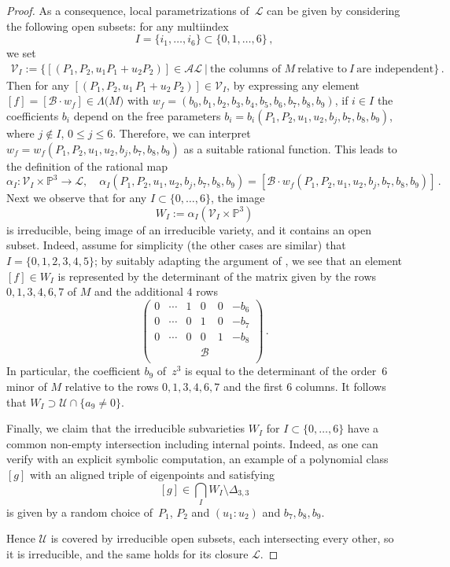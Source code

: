 \documentclass[a4paper, 11pt, reqno]{amsart}
\theoremstyle{plain}
\theoremstyle{definition}
\newcommand{\p}{\mathbb{P}}
\newcommand{\sL}{\mathcal{L}}
\newcommand{\sU}{\mathcal{U}}
\newcommand{\sV}{\mathcal{V}}
\begin{document}
\begin{proof}
As a consequence, local parametrizations of~$\sL$ can be given by considering the following open subsets:
for any multiindex
%
\[
  I = \{i_1, \dots, i_6\} \subset \{0, 1, \dots, 6\} \,,
\]
%
we set
%
\begin{multline*}
  \sV_I :=
  \bigl\{
    [(P_1, P_2, u_1 P_1 +u_2P_2)] \in \mathcal{AL} \ | \ \text{the\ columns\ of\ } M \
    \text{relative \ to} \ I\ \text{are\ independent}
  \bigr\} \,.
\end{multline*}
%
Then for any $[(P_1, P_2, u_1 \, P_1 + u_2 \, P_2)] \in \sV_I$, by expressing any element
$[f] =[\mathcal{B} \cdot w_f]\in \Lambda \bigl( M \bigr)$ with
$ w_f = (b_0,
  b_1,
  b_2,
  b_3,
  b_4,
  b_5, b_6,b_7,b_8,b_9)$,
%
if $i\in I$ the coefficients $b_i$ depend on the free parameters $b_i=b_i(P_1,P_2,u_1,u_2,b_j,b_7,b_8,b_9)$, where $j \not \in I$, $0\le j \le 6$. Therefore, we can interpret $w_f=w_f(P_1,P_2,u_1,u_2,b_j,b_7,b_8,b_9)$ as a suitable rational function.
This leads to the definition of the rational map
%
\[
  \alpha_I \colon \sV_I \times \p^3 \to \sL, \quad
  \alpha_I (P_1,P_2,u_1,u_2,b_j,b_7,b_8,b_9)=
  [\mathcal{B} \cdot w_f(P_1,P_2,u_1,u_2,b_j,b_7,b_8,b_9)] \,.
\]
%
Next we observe that for any $I \subset \{0,\dots, 6\}$, the image
%
\[
  W_I := \alpha_I (\sV_I \times \p^3)
\]
%
is irreducible, being image of an irreducible variety, and it
contains an open subset. Indeed, assume for simplicity (the other cases are similar) that
$I=\{0,1,2,3,4,5\}$; by suitably adapting the argument of \Cref{lemma:construct_cubic}, we see that an element $[f]\in W_I$ is represented by the determinant of the
matrix given by the rows
$0,1,3,4,6,7$ of $M$ and the additional $4$ rows
%
\[
  \left(
  \begin{array}{cccccc}
    0 & \cdots & 1&0&0&-b_6 \\
    0 & \cdots & 0&1&0&-b_7 \\
    0 & \cdots & 0&0&1&-b_8 \\
    & & & \mathcal{B} & & \\
  \end{array}
  \right) \,.
\]
%
In particular, the coefficient $b_9$ of~$z^3$ is equal to the determinant of the order~$6$ minor of $M$ relative to the rows $0,1,3,4,6,7$ and the first $6$ columns. It follows that $W_I \supset \sU \cap \{ a_9 \neq 0\}$.

Finally, we claim that the irreducible subvarieties $W_I$ for $I\subset \{0,\dots, 6\}$ have a common non-empty intersection
including internal points. Indeed, as one can verify with an explicit symbolic computation, an example of a polynomial
class~$[g]$ with an aligned triple of eigenpoints and satisfying
%
\[
  [g] \in \bigcap_I W_I \setminus \Delta_{3,3}
\]
%
is given by a random choice of~$P_1$, $P_2$ and $(u_1:u_2)$ and $b_7,b_8,b_9$.

Hence $\sU$ is covered by irreducible open subsets, each intersecting every other, so it is irreducible, and the same holds for its closure $\sL$.
\end{proof}
\end{document}
